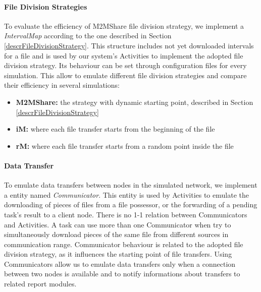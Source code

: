 \paragraph{File Division Strategies}
To evaluate the efficiency of M2MShare file division strategy, we implement a \textit{IntervalMap} according to the one described in Section \ref{descrFileDivisionStrategy}. This structure includes not yet downloaded intervals for a file and is used by our system's Activities to implement the adopted file division strategy. Its behaviour can be set through configuration files for every simulation. This allow to emulate different file division strategies and compare their efficiency in several simulations:
\begin{itemize}
\item \textbf{M2MShare:} the strategy with dynamic starting point, described in Section \ref{descrFileDivisionStrategy}
\item \textbf{iM:} where each file transfer starts from the beginning of the file
\item \textbf{rM:} where each file transfer starts from a random point inside the file
\end{itemize}


\paragraph{Data Transfer}
To emulate data transfers between nodes in the simulated network, we implement a entity named \textit{Communicator}. This entity is used by Activities to emulate the downloading of pieces of files from a file possessor, or the forwarding of a pending task's result to a client node. There is no 1-1 relation between Communicators and Activities. A task can use more than one Communicator when try to simultaneously download pieces of the same file from different sources in communication range. Communicator behaviour is related to the adopted file division strategy, as it influences the starting point of file transfers. Using Communicators allow us to emulate data transfers only when a connection between two nodes is available and to notify informations about transfers to related report modules.

%
 
